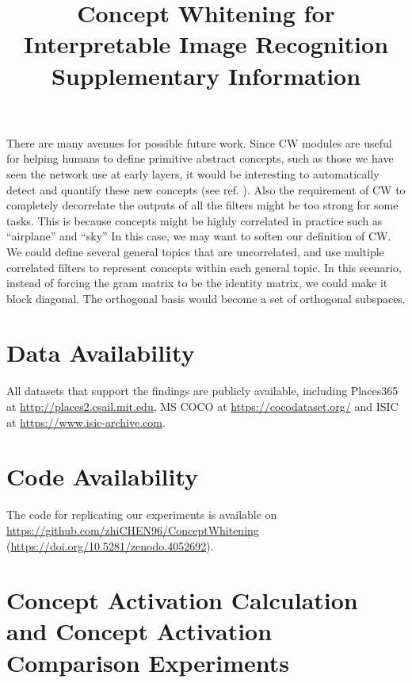 \documentclass{article}
\begin{document}
There are many avenues for possible future work. Since CW modules are useful for helping humans to define primitive abstract concepts, such as those we have seen the network use at early layers, it would be interesting to automatically detect and quantify these new concepts (see ref. \cite{ghorbani2019towards}). Also the requirement of CW to completely decorrelate the outputs of all the filters might be too strong for some tasks. This is because concepts might be highly correlated in practice such as ``airplane'' and ``sky'' In this case, we may want to soften our definition of CW. We could define several general topics that are uncorrelated, and use multiple correlated filters to represent concepts within each general topic. In this scenario, instead of forcing the gram matrix to be the identity matrix, we could make it block diagonal. The orthogonal basis would become a set of orthogonal subspaces.

\section*{Data Availability}
All datasets that support the findings are publicly available, including Places365 at \href{http://places2.csail.mit.edu}{http://places2.csail.mit.edu}, MS COCO at \href{https://cocodataset.org/}{https://cocodataset.org/} and ISIC at \href{https://www.isic-archive.com}{https://www.isic-archive.com}.

\section*{Code Availability}
The code for replicating our experiments is available on \href{https://github.com/zhiCHEN96/ConceptWhitening}{https://github.com/zhiCHEN96/ConceptWhitening} (\href{https://doi.org/10.5281/zenodo.4052692}{https://doi.org/10.5281/zenodo.4052692}).





\renewcommand\refname{Supplementary References}
\renewcommand{\figurename}{Supplementary Figure}
\renewcommand\tablename{Supplementary Table}

\newpage

\appendix
\onecolumn
\title{Concept Whitening for Interpretable Image Recognition \\ Supplementary Information}
\date{}
\maketitle
\section{Concept Activation Calculation and Concept Activation Comparison Experiments}
\label{sec:activation}
\end{document}
